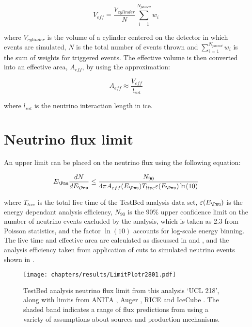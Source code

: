 \begin{equation}
  V_{eff} = \frac {V_{cylinder}}{N} \sum_{i=1}^{N_{passed}} w_{i}
\end{equation}

\noindent where $V_{cylinder}$ is the volume of a cylinder centered on the detector in which events are simulated, $N$ is the total number of events thrown and $\sum_{i=1}^{N_{passed}} w_{i}$ is the sum of weights for triggered events. The effective volume is then converted into an effective area, $A_{eff}$, by using the approximation:

\begin{equation}
  A_{eff} \approx \frac{V_{eff}}{l_{int}}
\end{equation}

\noindent where $l_{int}$ is the neutrino interaction length in ice. 

\section{Neutrino flux limit}
\label{sec:Results:Limit}

An upper limit can be placed on the neutrino flux using the following equation:

\begin{equation}
  E_{\Pnu} \frac {dN}{dE_{\Pnu}} \leq \frac{N_{90}}{4\pi A_{eff}(E_{\Pnu}) T_{live} \varepsilon(E_{\Pnu}) \ln(10)}
\end{equation}

\noindent where $T_{live}$ is the total live time of the TestBed analysis data set, $\varepsilon(E_{\Pnu})$ is the energy dependant analysis efficiency, $N_{90}$ is the $90\%$ upper confidence limit on the number of neutrino events excluded by the analysis, which is taken as 2.3 from Poisson statistics, and the factor $\ln(10)$ accounts for log-scale energy binning. The live time and effective area are calculated as discussed in  and , and the analysis efficiency taken from application of cuts to simulated neutrino events shown in . 



\begin{figure}[htpb]
  \texttt{[image: chapters/results/LimitPlotr2801.pdf]}
  \caption{TestBed analysis neutrino flux limit from this analysis `UCL 218', along with limits from ANITA \cite{PhysRevD.82.022004}, Auger \cite{Abraham:2009eh}, RICE \cite{PhysRevD.73.082002} and IceCube \cite{PhysRevD.88.112008}. The shaded band indicates a range of flux predictions from \cite{Kotera.2010} using a variety of assumptions about sources and production mechanisms.}
  \label{fig:Results:Limit-Plot}
\end{figure}

